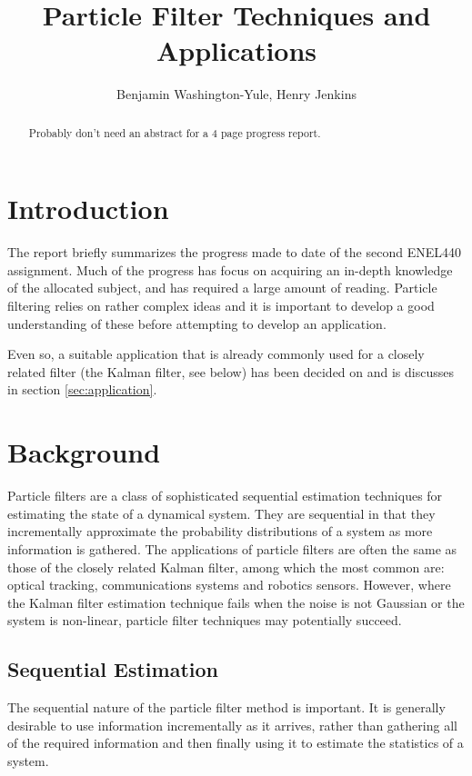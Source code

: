 \documentclass[11pt]{article}
\begin{document}
\title{Particle Filter Techniques and Applications}
\author{Benjamin Washington-Yule, Henry Jenkins}
\maketitle

\begin{abstract}
Probably don't need an abstract for a 4 page progress report.
\end{abstract}

\section{Introduction}
The report briefly summarizes the progress made to date of the second ENEL440
assignment. Much of the progress has focus on acquiring an in-depth knowledge
of the allocated subject, and has required a large amount of reading. Particle
filtering relies on rather complex ideas and it is important to develop a good
understanding of these before attempting to develop an application.

Even so, a suitable application that is already commonly used for a closely
related filter (the Kalman filter, see below) has been decided on and is
discusses in section \ref{sec:application}.

\section{Background}
Particle filters are a class of sophisticated sequential estimation techniques
for estimating the state of a dynamical system. They are sequential in that they
incrementally approximate the probability distributions of a system as more
information is gathered. The applications of particle filters are often the
same as those of the closely related Kalman filter, among which the most common
are: optical tracking, communications systems and robotics sensors. However,
where the Kalman filter estimation technique fails when the noise is not
Gaussian or the system is non-linear, particle filter techniques may potentially
succeed.

\subsection{Sequential Estimation}
The sequential nature of the particle filter method is important. It is
generally desirable to use information incrementally as it arrives, rather
than gathering all of the required information and then finally using it to
estimate the statistics of a system. 
\end{document}

